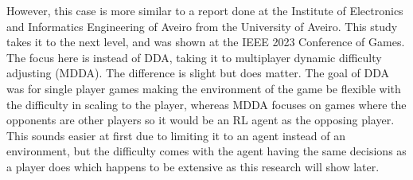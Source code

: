 However, this case is more similar to a report done at the Institute of Electronics and Informatics Engineering of Aveiro from the University of Aveiro\cite{reis_automatic_2023}. This study takes it to the next level, and was shown at the IEEE 2023 Conference of 
Games. The focus here is instead of DDA, taking it to multiplayer dynamic difficulty adjusting (MDDA). The difference is slight but does matter. The goal of DDA was for single player games making the environment of the game be flexible with the difficulty in scaling to 
the player, whereas MDDA focuses on games where the opponents are other players so it would be an RL agent as the opposing player. This sounds easier at first due to limiting it to an agent instead of an environment, but the difficulty comes with the agent having
the same decisions as a player does which happens to be extensive as this research will show later. 